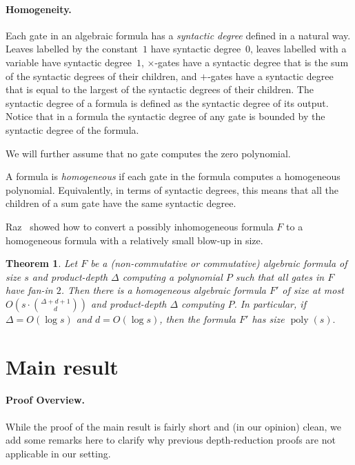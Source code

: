 \documentclass[11pt,a4paper]{article}
\newtheorem{theorem}{Theorem}
\newcommand{\poly}{\mathop{\mathrm{poly}}}
\begin{document}
\paragraph{Homogeneity.} Each gate in an algebraic formula has a \emph{syntactic degree} defined in a natural way. Leaves labelled by the constant~$1$ have syntactic degree~\(0\),  leaves labelled with a variable have syntactic degree~$1$, $\times$-gates have a syntactic degree that is the sum of the syntactic degrees of their children, and $+$-gates have a syntactic degree that is equal to the largest of the syntactic degrees of their children.
 The syntactic degree of a formula is defined as the syntactic degree of its output. Notice that in a formula  the syntactic degree of any gate is bounded by the syntactic degree of the formula. 

We will further assume that no gate computes the zero polynomial.

A formula is \emph{homogeneous} if each gate in the formula computes a homogeneous polynomial. Equivalently, in terms of syntactic degrees, this means that all the children of a sum gate have the same syntactic degree.

Raz~\cite{Raztensor} showed how to convert a possibly inhomogeneous formula $F$ to a homogeneous formula with a relatively small blow-up in size.

\begin{theorem}
\label{thm:Raz}
 Let $F$ be a (non-commutative or commutative) algebraic formula of size $s$ and product-depth $\Delta$ computing a polynomial $P$ such that all gates in $F$ have fan-in $2$. Then there is a \emph{homogeneous} algebraic formula $F'$ of size at most $O\left(s\cdot \binom{\Delta + d+1}{d}\right)$ and product-depth $\Delta$ computing $P$.  In particular, if $\Delta = O(\log s)$ and $d = O(\log s)$, then the formula $F'$ has size $\poly(s).$
\end{theorem}


\section{Main result}
\label{sec:mainlbd}


\paragraph{Proof Overview.} While the proof of the main result is fairly short and (in our opinion) clean, we add some remarks here to clarify why previous depth-reduction proofs are not applicable in our setting. 
\end{document}
